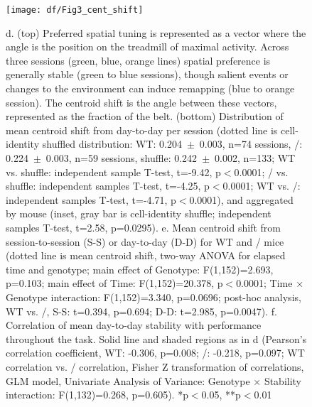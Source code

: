 \begin{figure}
	\centering
	\texttt{[image: df/Fig3\_cent\_shift]}
	\caption[Comparison of centroid shift]{d. (top) Preferred spatial tuning is represented as a vector where the angle is the position on the treadmill of maximal activity. Across three sessions (green, blue, orange lines) spatial preference is generally stable (green to blue sessions), though salient events or changes to the environment can induce remapping (blue to orange session). The centroid shift is the angle between these vectors, represented as the fraction of the belt. (bottom) Distribution of mean centroid shift from day-to-day per session (dotted line is cell-identity shuffled distribution: WT: 0.204~$\pm$~0.003, n=74 sessions, \df/: 0.224~$\pm$~0.003, n=59 sessions, shuffle: 0.242~$\pm$~0.002, n=133; WT vs. shuffle: independent sample T-test, t=-9.42, p$<$0.0001; \df/ vs. shuffle: independent samples T-test, t=-4.25, p$<$0.0001; WT vs. \df/: independent samples T-test, t=-4.71, p$<$0.0001), and aggregated by mouse (inset, gray bar is cell-identity shuffle; independent samples T-test, t=2.58, p=0.0295).  e. Mean centroid shift from session-to-session (S-S) or day-to-day (D-D) for WT and \df/ mice (dotted line is mean centroid shift, two-way ANOVA for elapsed time and genotype; main effect of Genotype: F(1,152)=2.693, p=0.103; main effect of Time: F(1,152)=20.378, p$<$0.0001; Time $\times$ Genotype interaction: F(1,152)=3.340, p=0.0696; post-hoc analysis, WT vs. \df/, S-S: t=0.394, p=0.694; D-D: t=2.985, p=0.0047). f. Correlation of mean day-to-day stability with performance throughout the task. Solid line and shaded regions as in d (Pearson's correlation coefficient, WT: -0.306, p=0.008; \df/: -0.218, p=0.097; WT correlation vs. \df/ correlation, Fisher Z transformation of correlations, GLM model, Univariate Analysis of Variance: Genotype $\times$ Stability interaction: F(1,132)=0.268, p=0.605). *p$<$0.05, **p$<$0.01}
	\label{fig:df:cent_shift}
\end{figure}
